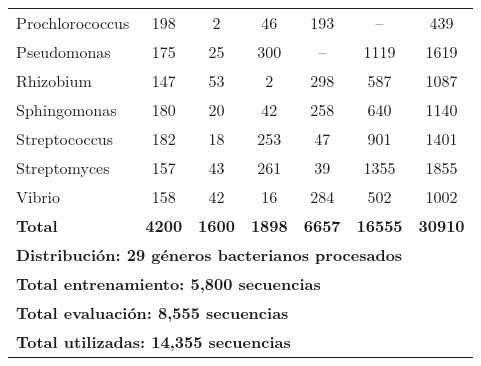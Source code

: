 \begin{table}[htbp]
\begin{tabular}{l|cc|cc|c|c}
Prochlorococcus & 198 & 2 & 46 & 193 & -- & 439 \\
Pseudomonas & 175 & 25 & 300 & -- & 1119 & 1619 \\
Rhizobium & 147 & 53 & 2 & 298 & 587 & 1087 \\
Sphingomonas & 180 & 20 & 42 & 258 & 640 & 1140 \\
Streptococcus & 182 & 18 & 253 & 47 & 901 & 1401 \\
Streptomyces & 157 & 43 & 261 & 39 & 1355 & 1855 \\
Vibrio & 158 & 42 & 16 & 284 & 502 & 1002 \\
\hline
\textbf{Total} & \textbf{4200} & \textbf{1600} & \textbf{1898} & \textbf{6657} & \textbf{16555} & \textbf{30910} \\
\hline
\multicolumn{7}{l}{\textbf{Distribución: 29 géneros bacterianos procesados}} \\
\multicolumn{7}{l}{\textbf{Total entrenamiento: 5,800 secuencias}} \\
\multicolumn{7}{l}{\textbf{Total evaluación: 8,555 secuencias}} \\
\multicolumn{7}{l}{\textbf{Total utilizadas: 14,355 secuencias}} \\
\hline
\end{tabular}
\end{table}